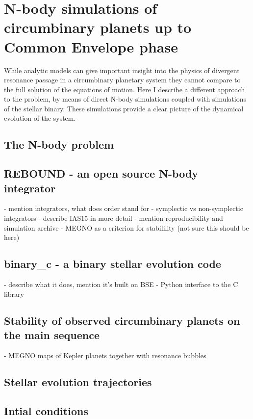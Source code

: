 \chapter{N-body simulations of circumbinary planets up to Common Envelope phase}
\label{ch:NBODY_simulations}
While analytic models can give important insight into the physics 
of divergent resonance passage in a circumbinary planetary system
they cannot compare to the full solution of the equations of motion.
Here I describe a different approach to the problem, by means of direct
N-body simulations coupled with simulations of the stellar binary. 
These simulations provide a clear picture of the dynamical evolution
of the system.

\section{The N-body problem}
\label{sec:The N-body problem}

\section{REBOUND - an open source N-body integrator}
\label{sec:REBOUND - an open source N-body integrator}
- mention integrators, what does order stand for
- symplectic vs non-symplectic integrators
- describe IAS15 in more detail
- mention reproducibility and simulation archive
- MEGNO as a criterion for stabilility (not sure this should be here) 

\section{binary\_c - a binary stellar evolution code}
\label{sec:binary_c - a binary stellar evolution code}
- describe what it does, mention it's built on BSE
- Python interface to the C library

\section{Stability of observed circumbinary planets on the main sequence}
\label{sec:Stability of observed circumbinary planets on the main sequence}
- MEGNO maps of Kepler planets together with resonance bubbles

\section{Stellar evolution trajectories}
\label{sec:Stellar evolution trajectories}


\section{Intial conditions}
\label{sec:Intial conditions}
